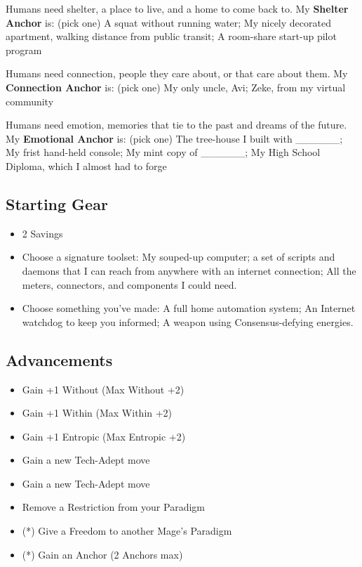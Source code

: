 \documentclass[
  oneside,
  statementpaper,
  9pt]{memoir}
\begin{document}
Humans need shelter, a place to live, and a home to come back to. My
\textbf{Shelter Anchor} is: (pick one) A squat without running water; My
nicely decorated apartment, walking distance from public transit; A
room-share start-up pilot program

Humans need connection, people they care about, or that care about them.
My \textbf{Connection Anchor} is: (pick one) My only uncle, Avi; Zeke,
from my virtual community

Humans need emotion, memories that tie to the past and dreams of the
future. My \textbf{Emotional Anchor} is: (pick one) The tree-house I
built with \_\_\_\_\_\_; My frist hand-held console; My mint copy of
\_\_\_\_\_\_; My High School Diploma, which I almost had to forge

\hypertarget{starting-gear-6}{%
\subsection{Starting Gear}\label{starting-gear-6}}

\begin{itemize}
\tightlist
\item
  2 Savings
\item
  Choose a signature toolset: My souped-up computer; a set of scripts
  and daemons that I can reach from anywhere with an internet
  connection; All the meters, connectors, and components I could need.
\item
  Choose something you've made: A full home automation system; An
  Internet watchdog to keep you informed; A weapon using
  Consensus-defying energies.
\end{itemize}

\hypertarget{advancements-6}{%
\subsection{Advancements}\label{advancements-6}}

\begin{itemize}
\tightlist
\item
  Gain +1 Without (Max Without +2)
\item
  Gain +1 Within (Max Within +2)
\item
  Gain +1 Entropic (Max Entropic +2)
\item
  Gain a new Tech-Adept move
\item
  Gain a new Tech-Adept move
\item
  Remove a Restriction from your Paradigm
\item
  (*) Give a Freedom to another Mage's Paradigm
\item
  (*) Gain an Anchor (2 Anchors max)
\end{itemize}
\end{document}
